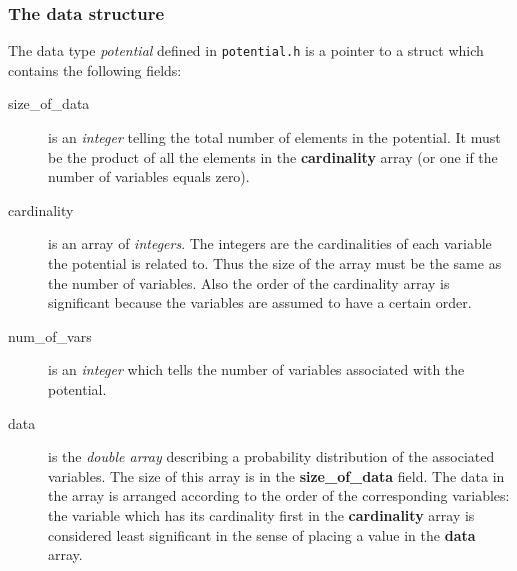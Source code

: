 \documentclass[12pt,a4paper]{report}
\begin{document}
\subsubsection{The data structure}
The data type {\it potential} defined in \verb+potential.h+ is a
pointer to a struct which contains the following fields:
\begin{description}
\item[size\_of\_data] is an {\it integer} telling the total number of 
elements in the potential. It must be the product of all the elements 
in the \textbf{cardinality} array (or one if the number of variables 
equals zero).
\item[cardinality] is an array of {\it integers}. The integers are the
cardinalities of each variable the potential is related to. Thus the
size of the array must be the same as the number of variables. Also
the order of the cardinality array is significant because the
variables are assumed to have a certain order.
\item[num\_of\_vars] is an {\it integer} which tells the number of variables
associated with the potential.
\item[data] is the {\it double array} describing a probability
distribution of the associated variables. The size of this array is in
the \textbf{size\_of\_data} field. The data in the array is arranged
according to the order of the corresponding variables: the variable
which has its cardinality first in the \textbf{cardinality} array is
considered least significant in the sense of placing a value in the
\textbf{data} array. 

\end{description}
\end{document}
